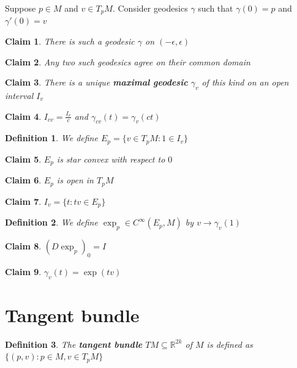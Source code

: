 \documentclass{article}
\newtheorem{definition}{Definition}
\newtheorem{claim}{Claim}
\begin{document}
Suppose $p \in M$ and $v \in T_pM$. Consider geodesics $\gamma$ such that $\gamma(0)=p$ and $\gamma'(0)=v$

\begin{claim}
    There is such a geodesic $\gamma$ on $(-\epsilon,\epsilon)$
\end{claim}

\begin{claim}
    Any two such geodesics agree on their common domain
\end{claim}

\begin{claim}
    There is a unique \textbf{maximal geodesic} $\gamma_v$ of this kind on an open interval $I_v$
\end{claim}

\begin{claim}
    $I_{cv}=\frac{I_v}{c}$ and $\gamma_{cv}(t)=\gamma_v(ct)$
\end{claim}

\begin{definition}
    We define $E_p =\{v \in T_pM:1 \in I_v\}$
\end{definition}

\begin{claim}
    $E_p$ is star convex with respect to $0$
\end{claim}

\begin{claim}
    $E_p$ is open in $T_pM$
\end{claim}

\begin{claim}
    $I_v=\{t:tv \in E_p\}$
\end{claim}

\begin{definition}
    We define $\exp_p \in C^\infty(E_p,M)$ by $v \to \gamma_v(1)$
\end{definition}

\begin{claim}
    $(D\exp_p)_0=I$
\end{claim}

\begin{claim}
    $\gamma_v(t)=\exp(tv)$
\end{claim}

\section{Tangent bundle}

\begin{definition}
    The \textbf{tangent bundle} $TM \subseteq \mathbb{R}^{2k}$ of $M$ is defined as $\{(p,v): p \in M,v \in T_pM\}$
\end{definition}
\end{document}
